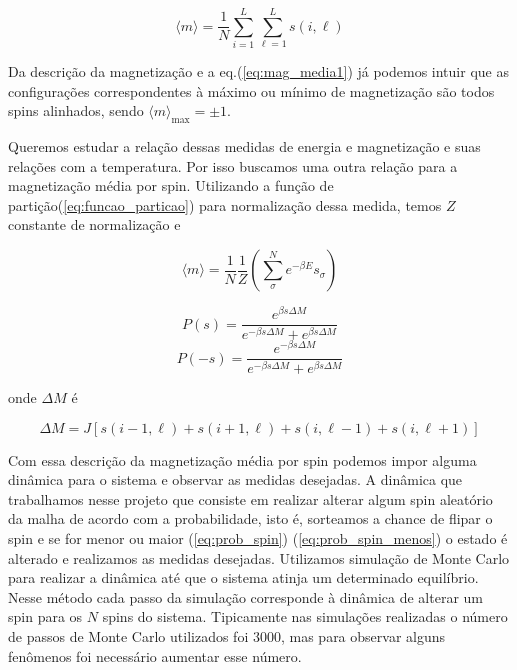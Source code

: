 \documentclass{tufte-handout}
\begin{document}
\begin{equation}
    \langle m \rangle = \frac{1}{N} \sum_{i = 1}^{L} \sum_{\ell = 1}^{L} s(i,  \ell) 
    \label{eq:mag_media1}
\end{equation}

Da descrição da magnetização e a eq.(\ref{eq:mag_media1}) já podemos intuir que as configurações
correspondentes à máximo ou mínimo de magnetização são todos spins alinhados, sendo 
$\langle m \rangle_{\text{max}} = \pm 1$.

Queremos estudar a relação dessas medidas de energia e magnetização e suas relações com a 
temperatura. Por isso buscamos uma outra relação para a magnetização média por spin. Utilizando 
a função de partição(\ref{eq:funcao_particao}) para normalização dessa medida, temos $Z$ constante de normalização
e 

\begin{equation}
  \langle m \rangle =  \frac{1}{N} \frac{1}{Z} \left( \sum_{\sigma}^{N} e^{- \beta E} s_\sigma \right)
  \label{eq:mag_media_normalizada}
\end{equation}

\begin{equation}
  P(s) = \frac{e^{\beta s \Delta M}}{e^{-\beta s \Delta M} + e^{\beta s \Delta M}}
  \label{eq:prob_spin}
\end{equation}
\begin{equation}
  P(-s) = \frac{e^{-\beta s \Delta M}}{e^{-\beta s \Delta M} + e^{\beta s \Delta M}} 
 \label{eq:prob_spin_menos}
\end{equation}

onde $\Delta M$ é 

\begin{equation}
  \Delta M = J \left[ s(i-1, \ell) + s(i+1, \ell) + s(i, \ell -1) +  s(i, \ell+1) \right]
\end{equation}

Com essa descrição da magnetização média por spin podemos impor alguma dinâmica para o sistema e observar 
as medidas desejadas.
A dinâmica que trabalhamos nesse projeto que consiste em realizar alterar 
algum spin aleatório da malha de acordo com a probabilidade, isto é, sorteamos a chance de flipar o spin 
e se for menor ou maior (\ref{eq:prob_spin}) (\ref{eq:prob_spin_menos}) o estado é alterado e realizamos as medidas desejadas. 
Utilizamos simulação de Monte Carlo para realizar a dinâmica até que o sistema atinja um determinado equilíbrio. Nesse
método cada passo da simulação corresponde à dinâmica de alterar um spin para os $N$ spins do sistema. Tipicamente nas simulações
realizadas o número de passos de Monte Carlo utilizados foi $3000$, mas para observar alguns fenômenos foi necessário aumentar esse 
número. 
\end{document}

